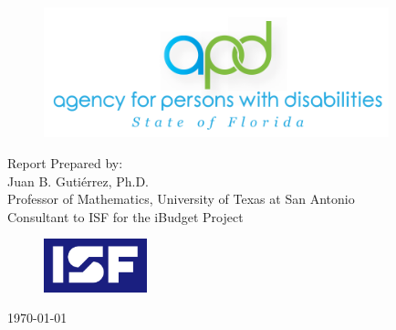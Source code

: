 \thispagestyle{empty}
\begin{center}
	{\Large \textbf{\sc{\TheTitle}} } 




	\begin{figure}[th]
		\centering
		\includegraphics[width=10cm]{../assets/APD-logo-BG.png}
	\end{figure}

	\vspace{3cm}
	{\centering Report Prepared by:  
	\\ Juan B. Gutiérrez, Ph.D.
	\\ Professor of Mathematics, University of Texas at San Antonio
	\\ Consultant to ISF for the iBudget Project}
	\vspace{\fill}

	\begin{figure}[th]
		\centering
		\includegraphics[width=3cm]{../assets/ISF-logo-medium.png}
	\end{figure}


	{\Large \textbf{\sc{\TheAuthor}}}

	{\normalsize \today}


	

\end{center}

\newpage
\thispagestyle{empty}

